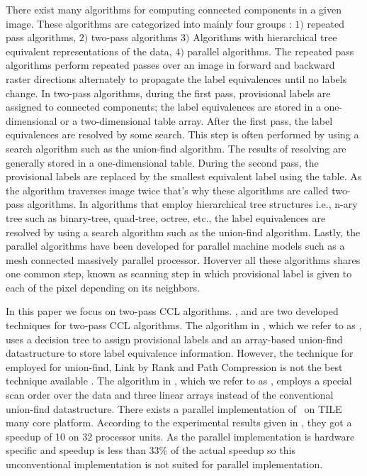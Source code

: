 There exist many algorithms for computing connected components in a given image. These algorithms are categorized into
mainly four groups %
\cite{Suzuki2003_Linear}
: $1)$ repeated pass algorithms, $2)$ two-pass algorithms $3)$ Algorithms with hierarchical tree equivalent representations 
of the data, $4)$ parallel algorithms.
The repeated pass algorithms perform repeated passes over an image in forward and backward raster directions alternately
to propagate the label equivalences until no labels change.
In two-pass algorithms, during the first pass, provisional labels are assigned to connected components;
the label equivalences are stored in a one-dimensional or a two-dimensional table array. After the first pass, the label 
equivalences are resolved by some search. This step is often performed by using
a search algorithm such as the union-find algorithm.
The results of resolving are generally stored in a one-dimensional table. During the second pass, the provisional labels are 
replaced by the smallest equivalent label using the table. As the algorithm traverses image twice that's why these algorithms 
are called two-pass algorithms.
In algorithms that employ hierarchical tree structures i.e., n-ary tree such as binary-tree, quad-tree, octree, etc., the
label equivalences are resolved by using a search algorithm such as the union-find algorithm.
Lastly, the parallel algorithms have been developed for parallel machine models such as a mesh connected massively parallel processor.
Hoverver all these algorithms shares one common step, known as scanning step in which provisional label is given to each of the
pixel depending on its neighbors.

In this paper we focus on two-pass CCL algorithms. \cite{Wu2009_LRPC}, and \cite{He2012_ARun} are two
developed techniques for two-pass CCL algorithms.
The algorithm in \cite{Wu2009_LRPC}, which we refer to as \lrpc, uses a decision tree to assign provisional labels and an array-based union-find datastructure
to store label equivalence information. However, the technique for employed for union-find, Link by Rank and Path Compression is
not the best technique available \cite{Patwary2012_PARemSP}. 
The algorithm in \cite{He2012_ARun}, which we refer to as \arun, employs a special scan order over the data and three linear
arrays instead of the conventional union-find datastructure. There
exists a parallel implementation of \arun\ on TILE many core
platform\cite{Chen2013_PARun}. According to the
experimental results given in \cite{Chen2013_PARun}, they got a speedup of 10 on
32 processor units. 
As the parallel implementation is hardware specific and
speedup is less than 33\% of the actual speedup so this unconventional implementation is not suited for parallel implementation.

